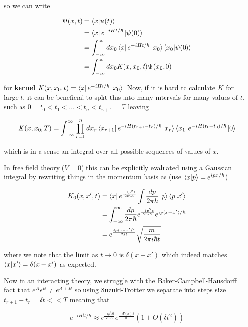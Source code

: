 \documentclass{article}
\theoremstyle{definition}
\begin{document}
so we can write

\begin{align*}
  \Psi(x, t) &= \bra{x} \ket{\psi(t)} \\
             &= \bra{x} e^{-i H t / \hbar} \ket{\psi(0)} \\
             &= \int_{-\infty}^\infty dx_0 \bra{x} e^{-i H t / \hbar} \ket{x_0} \bra{x_0} \ket{\psi(0)} \\
             &= \int_{-\infty}^\infty dx_0 K(x, x_0, t) \Psi(x_0, 0)
\end{align*}

for \textbf{kernel} $K(x, x_0, t) = \bra{x} e^{-i H t / \hbar} \ket{x_0}$. Now,
if it is hard to calculate $K$ for large $t$, it can be beneficial to split this
into many intervals for many values of $t$, such as $0 = t_0 < t_1 < \dots < t_n
< t_{n + 1} = T$ leaving

\begin{equation}
  K(x, x_0, T) = \int_{-\infty}^\infty \prod_{r = 1}^n dx_r \bra{x_{r + 1}} e^{- iH(t_{r + 1} - t_r) / \hbar} \ket{x_r} \bra{x_1} e^{-iH (t_1 - t_0) / \hbar} \ket{0}
\end{equation}

which is in a sense an integral over all possible sequences of values of $x$. 

In free field theory ($V = 0$) this can be explicitly evaluated using a Gaussian
integral by rewriting things in the momentum basis as (use $\bra{x} \ket{p} =
e^{i px / \hbar}$)

\begin{align*}
  K_0(x, x', t) &= \bra{x} e^{\frac{-i p^2 t}{2m \hbar}} \int \frac{dp}{2\pi \hbar} \ket{p} \bra{p} \ket{x'} \\
                &= \int_{-\infty}^\infty \frac{dp}{2 \pi \hbar} e^{\frac{-ip^2 t}{2m \hbar}} e^{ip (x - x') / \hbar}\\
                &= e^{\frac{ip(x - x')^2}{2\hbar t}} \sqrt{\frac{m}{2\pi i \hbar t}}
\end{align*}

where we note that the limit as $t \to 0$ is $\delta(x - x')$ which indeed
matches $\bra{x} \ket{x'} = \delta(x - x')$ as expected.

Now in an interacting theory, we struggle with the Baker-Campbell-Hausdorff fact
that $e^A e^B \neq e^{A + B}$ so using Suzuki-Trotter we separate into steps
size $t_{r + 1} - t_r = \delta t << T$ meaning that

\begin{equation}
  e^{-iH \delta t / \hbar} \approx e^{\frac{-ip^2 \delta t}{2m \hbar}} e^{\frac{-i V(x) \delta}{\hbar}} (1 + O(\delta t^2))
\end{equation}
\end{document}

